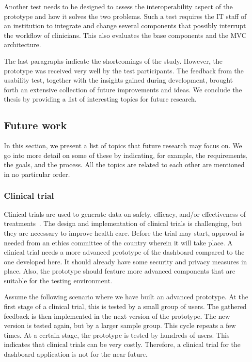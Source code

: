     Another test needs to be designed to assess the interoperability aspect of the prototype and how it solves the two problems. Such a test requires the IT staff of an institution to integrate and change several components that possibly interrupt the workflow of clinicians. This also evaluates the base components and the MVC architecture.

    The last paragraphs indicate the shortcomings of the study. However, the prototype was received very well by the test participants. The feedback from the usability test, together with the insights gained during development, brought forth an extensive collection of future improvements and ideas. We conclude the thesis by providing a list of interesting topics for future research.

    \subsection{Future work}\label{future_work}

    In this section, we present a list of topics that future research may focus on. We go into more detail on some of these by indicating, for example, the requirements, the goals, and the process. All the topics are related to each other are mentioned in no particular order.
 
    \subsubsection{Clinical trial}

    Clinical trials are used to generate data on safety, efficacy, and/or effectiveness of treatments~\cite{Minneci2018}. The design and implementation of clinical trials is challenging, but they are necessary to improve health care. Before the trial may start, approval is needed from an ethics committee of the country wherein it will take place. A clinical trial needs a more advanced prototype of the dashboard compared to the one developed here. It should already have some security and privacy measures in place. Also, the prototype should feature more advanced components that are suitable for the testing environment.

    Assume the following scenario where we have built an advanced prototype. At the first stage of a clinical trial, this is tested by a small group of users. The gathered feedback is then implemented in the next version of the prototype. The new version is tested again, but by a larger sample group. This cycle repeats a few times. At a certain stage, the prototype is tested by hundreds of users. This indicates that clinical trials can be very costly. Therefore, a clinical trial for the dashboard application is not for the near future.

